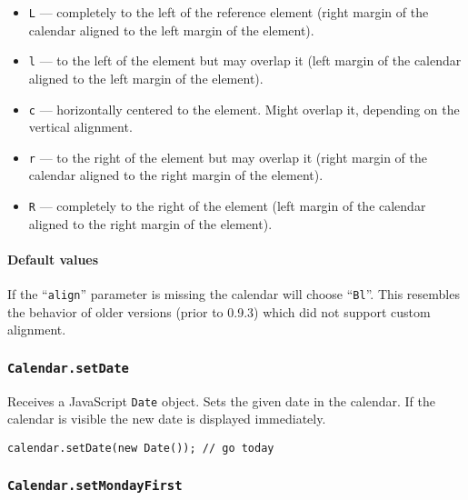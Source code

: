 \documentclass[a4paper,10pt]{article}
\begin{document}
\begin{itemize}

\item \texttt{L} --- completely to the left of the reference element (right
margin of the calendar aligned to the left margin of the element).

\item \texttt{l} --- to the left of the element but may overlap it (left margin
of the calendar aligned to the left margin of the element).

\item \texttt{c} --- horizontally centered to the element.  Might overlap it,
depending on the vertical alignment.

\item \texttt{r} --- to the right of the element but may overlap it (right
margin of the calendar aligned to the right margin of the element).

\item \texttt{R} --- completely to the right of the element (left margin of the
calendar aligned to the right margin of the element).

\end{itemize}

\paragraph{Default values}
If the ``\texttt{align}'' parameter is missing the calendar will choose
``\texttt{Bl}''.  This resembles the behavior of older versions (prior to
0.9.3) which did not support custom alignment.

\subsubsection{\texttt{Calendar.setDate}}\label{sec:Calendar.setDate}

Receives a JavaScript \texttt{Date} object.  Sets the given date in the
calendar.  If the calendar is visible the new date is displayed immediately.

\begin{verbatim}
calendar.setDate(new Date()); // go today
\end{verbatim}

\subsubsection{\texttt{Calendar.setMondayFirst}}\label{sec:Calendar.setMondayFirst}
\end{document}
